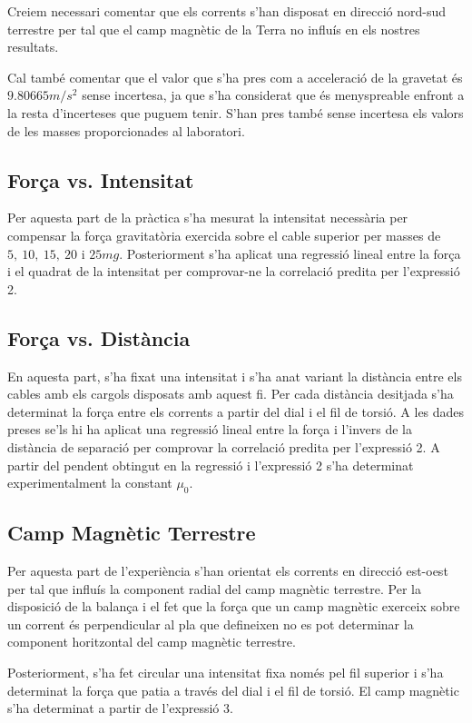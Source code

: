 \begin{multicols}{2}
	Creiem necessari comentar que els corrents s'han disposat en direcció nord-sud terrestre per tal que el camp magnètic de la Terra no influís en els nostres resultats.

	Cal també comentar que el valor que s'ha pres com a acceleració de la gravetat és $9.80665 \si{m/s^2}$ sense incertesa, ja que s'ha considerat que és menyspreable enfront a la resta d'incerteses que puguem tenir. S'han pres també sense incertesa els valors de les masses proporcionades al laboratori.

	\subsection{Força vs. Intensitat}

	Per aquesta part de la pràctica s'ha mesurat la intensitat necessària per compensar la força gravitatòria exercida sobre el cable superior per masses de $5,\ 10,\ 15,\ 20$ i $25\si{mg}$. Posteriorment s'ha aplicat una regressió lineal entre la força i el quadrat de la intensitat per comprovar-ne la correlació predita per l'expressió 2.

	\subsection{Força vs. Distància}
	En aquesta part, s'ha fixat una intensitat i s'ha anat variant la distància entre els cables amb els cargols disposats amb aquest fi. Per cada distància desitjada s'ha determinat la força entre els corrents a partir del dial i el fil de torsió. A les dades preses se'ls hi ha aplicat una regressió lineal entre la força i l'invers de la distància de separació per comprovar la correlació predita per l'expressió 2. A partir del pendent obtingut en la regressió i l'expressió 2 s'ha determinat experimentalment la constant $\mu_0$.
	\subsection{Camp Magnètic Terrestre}
	Per aquesta part de l'experiència %
	s'han orientat els corrents en direcció est-oest per tal que influís la component radial del camp magnètic terrestre. Per la disposició de la balança i el fet que la força que un camp magnètic exerceix sobre un corrent és perpendicular al pla que defineixen no es pot determinar la component horitzontal del camp magnètic terrestre.

	Posteriorment, s'ha fet circular una intensitat fixa només pel fil superior i s'ha determinat la força que patia a través del dial i el fil de torsió. El camp magnètic s'ha determinat a partir de l'expressió 3. 
\end{multicols}
